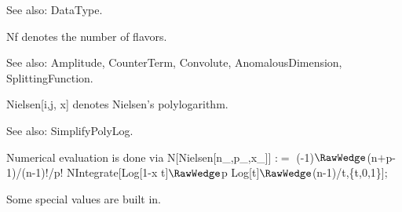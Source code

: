 See also:  DataType.



Nf denotes the number of flavors.

See also:  Amplitude, CounterTerm, Convolute, AnomalousDimension, SplittingFunction.



Nielsen[i,j, x] denotes Nielsen's polylogarithm.



See also:  SimplifyPolyLog.




Numerical evaluation is done via N[Nielsen[n\_{},p\_{},x\_{}]] :\(=\) (-1)\(\RawWedge\)(n\(+\)p-1)/(n-1)!/p! NIntegrate[Log[1-x
  t]\(\RawWedge\)p Log[t]\(\RawWedge\)(n-1)/t,\{t,0,1\}];



Some special values are built in.









